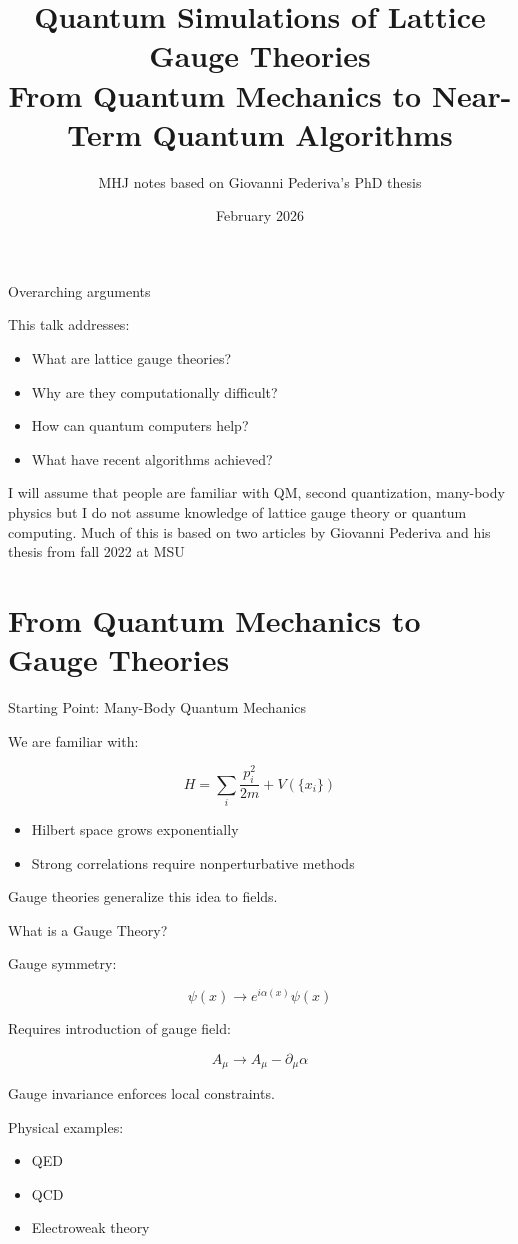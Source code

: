 \documentclass[11pt]{beamer}
\title[Quantum Simulation of Lattice Gauge Theories]
{Quantum Simulations of Lattice Gauge Theories\\
From Quantum Mechanics to Near-Term Quantum Algorithms}
\author{MHJ notes based on Giovanni Pederiva's PhD thesis}
\date{February 2026}
\begin{document}
\begin{frame}
\titlepage
\end{frame}

\begin{frame}{Overarching arguments}

This talk addresses:

\begin{itemize}
\item What are lattice gauge theories?
\item Why are they computationally difficult?
\item How can quantum computers help?
\item What have recent algorithms achieved?
\end{itemize}

I will assume that people are familiar with QM, second quantization,
many-body physics but I do not assume knowledge of lattice gauge
theory or quantum computing. Much of this is based on two articles by
Giovanni Pederiva and his thesis from fall 2022 at MSU

\end{frame}

\section{From Quantum Mechanics to Gauge Theories}

\begin{frame}{Starting Point: Many-Body Quantum Mechanics}

We are familiar with:

\[
H = \sum_i \frac{p_i^2}{2m} + V(\{x_i\})
\]

\begin{itemize}
\item Hilbert space grows exponentially
\item Strong correlations require nonperturbative methods
\end{itemize}

Gauge theories generalize this idea to fields.
\end{frame}

\begin{frame}{What is a Gauge Theory?}

Gauge symmetry:

\[
\psi(x) \rightarrow e^{i\alpha(x)} \psi(x)
\]

Requires introduction of gauge field:

\[
A_\mu \rightarrow A_\mu - \partial_\mu \alpha
\]

Gauge invariance enforces local constraints.

Physical examples:
\begin{itemize}
\item QED
\item QCD
\item Electroweak theory
\end{itemize}
\end{frame}
\end{document}
